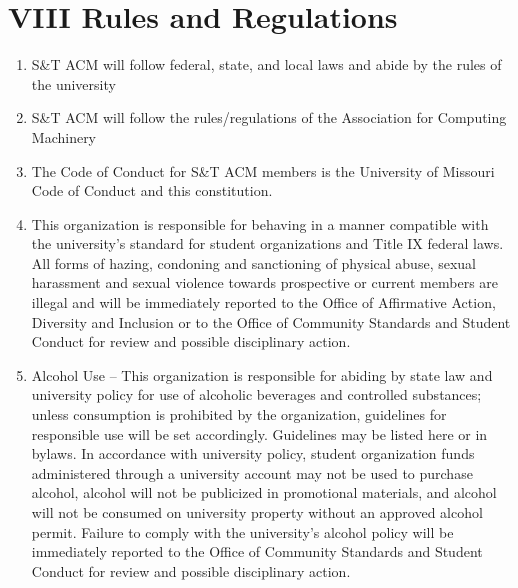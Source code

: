 
\section{VIII \textendash{} Rules and Regulations} \label{sec:rules_and_regulations}
  \begin{enumerate}
    \item S\&T ACM will follow federal, state, and local laws and abide by the
      rules of the university
    \item S\&T ACM will follow the rules/regulations of the Association for
      Computing Machinery
    \item The Code of Conduct for S\&T ACM members is the University of Missouri
      Code of Conduct and this constitution.
    \item This organization is responsible for behaving in a manner compatible
      with the university’s standard for student organizations and Title IX
      federal laws.  All forms of hazing, condoning and sanctioning of physical
      abuse, sexual harassment and sexual violence towards prospective or
      current members are illegal and will be immediately reported to the Office
      of Affirmative Action, Diversity and Inclusion or to the Office of
      Community Standards and Student Conduct for review and possible
      disciplinary action.  \item Alcohol Use – This organization is responsible
      for abiding by state law and university policy for use of alcoholic
      beverages and controlled substances; unless consumption is prohibited by
      the organization, guidelines for responsible use will be set accordingly.
      {Guidelines may be listed here or in bylaws}. In accordance with
      university policy, student organization funds administered through a
      university account may not be used to purchase alcohol, alcohol will not
      be publicized in promotional materials, and alcohol will not be consumed
      on university property without an approved alcohol permit. Failure to
      comply with the university’s alcohol policy will be immediately reported
      to the Office of Community Standards and Student Conduct for review and
      possible disciplinary action.
  \end{enumerate}

